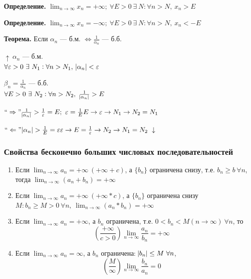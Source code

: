 \documentclass{article}
\begin{document}
    \textbf{Определение.} \(\lim_{n \rightarrow \infty}{x_n} = +\infty;\ \forall E > 0\ \exists\ N : \forall n > N,\ x_n > E\)
    
    \textbf{Определение.} \(\lim_{n \rightarrow \infty}{x_n} = -\infty;\ \forall E > 0\ \exists\ N : \forall n > N,\ x_n < -E\)
    
    \textbf{Теорема.} Если \(\alpha_n\) --- б.м. \(\Leftrightarrow \frac{1}{\alpha_n}\) --- б.б.
    
    \(\uparrow\ \alpha_n\) --- б.м.\\
    \(\forall \varepsilon > 0\ \exists\ N_1 : \forall n > N_1,\ \abs{\alpha_n} < \varepsilon\)
    
    \(\beta_n = \frac{1}{\alpha_n}\) --- б.б.\\
    \(\forall E > 0\ \exists\ N_2 : \forall n > N_2,\ \frac{1}{\abs{\alpha_n}} > E\)
    
    \(``\Rightarrow" \frac{1}{\abs{\alpha_n}} > \frac{1}{\varepsilon} = E;\ \varepsilon = \frac{1}{E}\\
    E \rightarrow \varepsilon \rightarrow N_1 \rightarrow N_2 = N_1\)
    
    \(``\Leftarrow" \abs{\alpha_n} > \frac{1}{E} = \varepsilon\\
    \varepsilon \rightarrow E = \frac{1}{\varepsilon} \rightarrow N_2 \rightarrow N_1 = N_2\ \downarrow\)
    
    \subsubsection{Свойства бесконечно больших числовых последовательностей}
    
    \begin{enumerate}
        \item Если \( \lim_{n \rightarrow \infty }a_n = + \infty\ (+\infty + c) \), а \( \{b_n\} \) ограничена снизу, т.е. \( b_n \geq b\ \forall n \), тогда \(\lim_{n \rightarrow \infty}{(a_n + b_n)} = +\infty\)
       
        \item Если \( \lim_{n \rightarrow \infty }a_n = + \infty\ (+\infty * c) \), а \( \{b_n\} \) ограничена снизу \( M: b_n \geq M > 0\ \forall n,\ \lim_{n \rightarrow \infty}{(a_n * b_n)} = +\infty\)

        \item Если \( \lim_{n \rightarrow \infty }a_n = +\infty \), а \( b_n \) ограничена, т.е. \( 0 < b_n < M (n \rightarrow \infty)\ \forall n \), то \[ (\frac{+\infty}{c > 0}) \lim_{n \rightarrow \infty}{\frac{a_n}{b_n}} = +\infty\]
    
        \item Если \(\lim_{n \rightarrow \infty}{a_n} = \infty\), а \(b_n\) ограничена: \(\abs{b_n} \leq M\  \forall n\), \[ (\frac{M}{\infty}) \lim_{n \rightarrow \infty }\frac{b_n}{a_n} = 0\]
    \end{enumerate}
    
\end{document}
